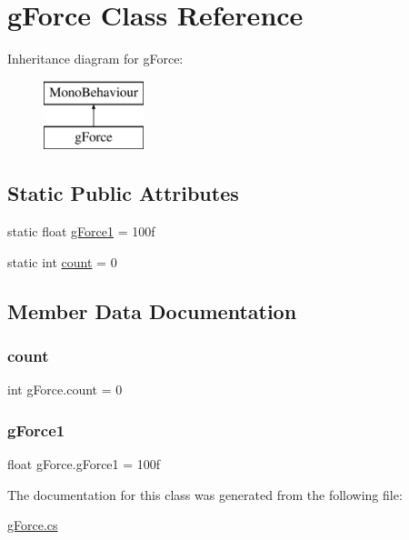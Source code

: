 \hypertarget{classg_force}{}\section{g\+Force Class Reference}
\label{classg_force}
Inheritance diagram for g\+Force\+:\begin{figure}[H]
\begin{center}
\leavevmode
\includegraphics[height=2.000000cm]{classg_force}
\end{center}
\end{figure}
\subsection*{Static Public Attributes}
\begin{DoxyCompactItemize}
\item 
static float \hyperlink{classg_force_a768c1086a7bb309e3b31c88bb37c7198}{g\+Force1} = 100f
\item 
static int \hyperlink{classg_force_ae105a71410112d3e2ea042209b3292da}{count} = 0
\end{DoxyCompactItemize}


\subsection{Member Data Documentation}
\mbox{\label{classg_force_ae105a71410112d3e2ea042209b3292da}} 
\subsubsection{\texorpdfstring{count}{count}}
{\footnotesize\ttfamily int g\+Force.\+count = 0\hspace{0.3cm}{\ttfamily [static]}}

\mbox{\label{classg_force_a768c1086a7bb309e3b31c88bb37c7198}} 
\subsubsection{\texorpdfstring{g\+Force1}{gForce1}}
{\footnotesize\ttfamily float g\+Force.\+g\+Force1 = 100f\hspace{0.3cm}{\ttfamily [static]}}



The documentation for this class was generated from the following file\+:\begin{DoxyCompactItemize}
\item 
\hyperlink{g_force_8cs}{g\+Force.\+cs}\end{DoxyCompactItemize}
